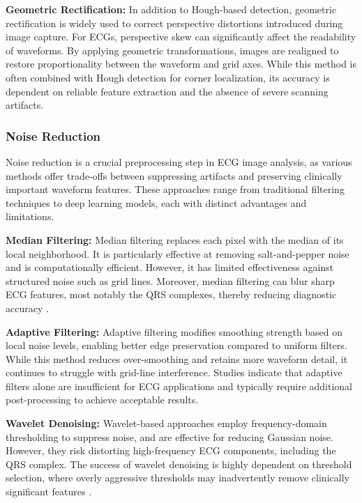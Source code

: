\textbf{Geometric Rectification:} In addition to Hough-based detection, geometric rectification is widely used to correct perspective distortions introduced during image capture. For ECGs, perspective skew can significantly affect the readability of waveforms. By applying geometric transformations, images are realigned to restore proportionality between the waveform and grid axes. While this method is often combined with Hough detection for corner localization, its accuracy is dependent on reliable feature extraction and the absence of severe scanning artifacts.


\subsubsection{Noise Reduction} 

Noise reduction is a crucial preprocessing step in ECG image analysis, as various methods offer trade-offs between suppressing artifacts and preserving clinically important waveform features. These approaches range from traditional filtering techniques to deep learning models, each with distinct advantages and limitations.

\textbf{Median Filtering:} Median filtering replaces each pixel with the median of its local neighborhood. It is particularly effective at removing salt-and-pepper noise and is computationally efficient. However, it has limited effectiveness against structured noise such as grid lines. Moreover, median filtering can blur sharp ECG features, most notably the QRS complexes, thereby reducing diagnostic accuracy \cite{LI2020104077}.

\textbf{Adaptive Filtering:} Adaptive filtering modifies smoothing strength based on local noise levels, enabling better edge preservation compared to uniform filters. While this method reduces over-smoothing and retains more waveform detail, it continues to struggle with grid-line interference. Studies indicate that adaptive filters alone are insufficient for ECG applications and typically require additional post-processing to achieve acceptable results.

\textbf{Wavelet Denoising:} Wavelet-based approaches employ frequency-domain thresholding to suppress noise, and are effective for reducing Gaussian noise. However, they risk distorting high-frequency ECG components, including the QRS complex. The success of wavelet denoising is highly dependent on threshold selection, where overly aggressive thresholds may inadvertently remove clinically significant features \cite{LI2020104077}.

